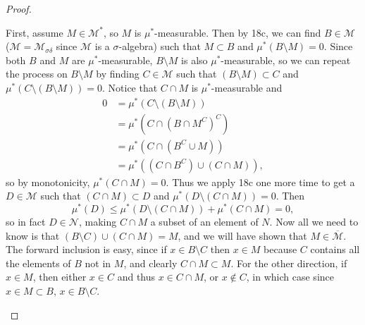 \documentclass{article}
\theoremstyle{definition}
\begin{document}
\begin{proof}
\begin{enumerate}[label=\textbf{\alph*.}]
		      First, assume $M \in \mathscr{M}^*$, so $M$ is $\mu^*$-measurable.
		      Then by 18c, we can find $B \in \mathscr{M}$ ($\mathscr{M} = \mathscr{M}_{\sigma\delta}$ since $\mathscr{M}$ is a $\sigma$-algebra) such that $M \subset B$ and $\mu^*(B \setminus M) = 0$.
		      Since both $B$ and $M$ are $\mu^*$-measurable, $B \setminus M$ is also $\mu^*$-measurable, so we can repeat the process on $B \setminus M$ by finding $C \in \mathscr{M}$ such that $(B \setminus M) \subset C$ and $\mu^*(C \setminus (B \setminus M)) = 0$.
		      Notice that $C \cap M$ is $\mu^*$-measurable and \begin{align*}
			      0 & = \mu^*(C \setminus (B \setminus M))   \\
			        & = \mu^*(C \cap (B \cap M^C)^C)         \\
			        & = \mu^*(C \cap (B^C \cup M))           \\
			        & = \mu^*((C \cap B^C) \cup (C \cap M)),
		      \end{align*}
		      so by monotonicity, $\mu^*(C \cap M) = 0$.
		      Thus we apply 18c one more time to get a $D \in \mathscr{M}$ such that $(C \cap M) \subset D$ and $\mu^*(D \setminus (C \cap M)) = 0$.
		      Then \begin{equation*}
			      \mu^*(D) \leq \mu^*(D \setminus (C \cap M)) + \mu^*(C \cap M) = 0,
		      \end{equation*}
		      so in fact $D \in \mathscr{N}$, making $C \cap M$ a subset of an element of $N$.
		      Now all we need to know is that $(B \setminus C) \cup (C \cap M) = M$, and we will have shown that $M \in \overline{\mathscr{M}}$.
		      The forward inclusion is easy, since if $x \in B \setminus C$ then $x \in M$ because $C$ contains all the elements of $B$ not in $M$, and clearly $C \cap M \subset M$.
		      For the other direction, if $x \in M$, then either $x \in C$ and thus $x \in C \cap M$, or $x \notin C$, in which case since $x \in M \subset B$, $x \in B \setminus C$.


\end{enumerate}
\end{proof}
\end{document}

